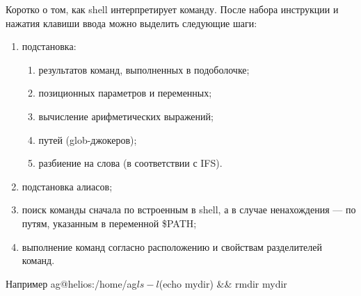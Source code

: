 Коротко о том, как shell интерпретирует команду. После набора инструкции и нажатия клавиши ввода можно выделить следующие шаги:

\begin{enumerate}
	\item подстановка:
		\begin{enumerate}
			\item результатов команд, выполненных в подоболочке;
			\item позиционных параметров и переменных;
			\item вычисление арифметических выражений;
			\item путей (glob-джокеров);
			\item разбиение на слова (в соответствии с IFS).
		\end{enumerate}
	\item подстановка алиасов;
	\item поиск команды сначала по встроенным в shell, а в случае ненахождения --- по путям, указанным в переменной \$PATH;
	\item выполнение команд согласно расположению и свойствам разделителей команд.
\end{enumerate}

\begin{shCode}{Например}
	ag@helios:/home/ag$ ls -l $(echo mydir) && rmdir mydir \end{shCode}